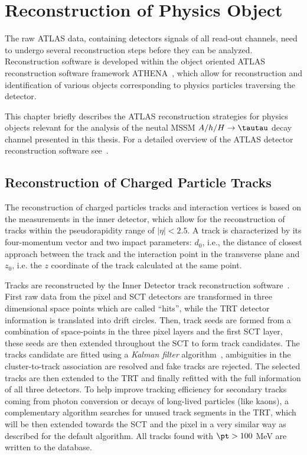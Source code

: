 \chapter{Reconstruction of Physics Object}\label{chap:obj} \vspace{1cm}

The raw ATLAS  data, containing  detectors signals of all  read-out channels, need to
 undergo  several reconstruction steps before they can be analyzed. Reconstruction software is developed 
 within the object oriented ATLAS reconstruction software framework ATHENA~\cite{Athena}, which allow for reconstruction and 
identification of various objects corresponding to physics particles traversing the detector.


This chapter briefly describes the ATLAS reconstruction strategies for physics objects relevant for the 
analysis of the neutal MSSM $A/h/H \rightarrow \tautau$ decay channel presented in this thesis.
For a detailed overview of the ATLAS detector reconstruction software  see~\cite{AtlasCSCBook}. 

\restoregeometry
\clearpage

\section{Reconstruction of Charged Particle Tracks}
The reconstruction of charged particles tracks and interaction vertices is based on the measurements in the inner detector,
which allow for the reconstruction of tracks within the pseudorapidity range of $|\eta| < 2.5$. 
A track is characterized by its four-momentum vector and two impact parameters: $d_0$, i.e.,  the distance 
of closest approach between the track and the interaction point in the transverse plane and $z_0$, i.e.
the $z$ coordinate of the track calculated at the same point. 

Tracks are reconstructed  by the Inner Detector track reconstruction software~\cite{IDtracking}.
First raw data from the pixel and SCT detectors are transformed in three dimensional space points 
which are called ``hits'', while the  TRT detector information is translated into drift circles. 
Then, track seeds are formed from a combination of space-points in the three pixel layers and the first SCT layer, these
seeds are then extended throughout the SCT to form track candidates. The tracks candidate are fitted 
using a \emph{Kalman filter} algorithm~\cite{Kalman}, ambiguities in the cluster-to-track association are resolved
and fake tracks are rejected. The selected tracks are then extended to the TRT and finally refitted with the full information of all three
detectors. To help improve tracking efficiency for secondary tracks coming from photon conversion or decays of long-lived 
particles (like kaons), a complementary algorithm searches for unused track segments in the TRT, which will be then extended
towards the SCT and the pixel in a very similar way as described for the default algorithm.
All tracks found with $\pt > 100$ MeV are written to the database.


